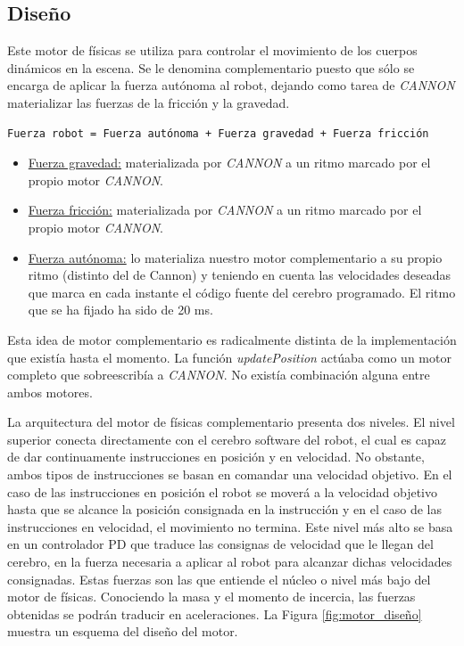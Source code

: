 \subsection{Diseño}
Este motor de físicas se utiliza para controlar el movimiento de los cuerpos dinámicos en la escena. Se le denomina complementario puesto que sólo se encarga de aplicar la fuerza autónoma al robot, dejando como tarea de \textit{CANNON} materializar las fuerzas de la fricción y la gravedad.

\begin{verbatim}
Fuerza robot = Fuerza autónoma + Fuerza gravedad + Fuerza fricción
\end{verbatim}

\begin{itemize}
    \item \underline{Fuerza gravedad:} materializada por \textit{CANNON} a un ritmo marcado por el propio motor \textit{CANNON}.
    \item \underline{Fuerza fricción:} materializada por \textit{CANNON} a un ritmo marcado por el propio motor \textit{CANNON}.
    \item \underline{Fuerza autónoma:} lo materializa nuestro motor complementario a su propio ritmo (distinto del de Cannon) y teniendo en cuenta las velocidades deseadas que marca en cada instante el código fuente del cerebro programado. El ritmo que se ha fijado ha sido de 20 ms.
\end{itemize}

Esta idea de motor complementario es radicalmente distinta de la implementación que existía hasta el momento. La función \textit{updatePosition} actúaba como un motor completo que sobreescribía a \textit{CANNON}. No existía combinación alguna entre ambos motores. \newline


La arquitectura del motor de físicas complementario presenta dos niveles. El nivel superior conecta directamente con el cerebro software del robot, el cual es capaz de dar continuamente instrucciones en posición y en velocidad. No obstante, ambos tipos de instrucciones se basan en comandar una velocidad objetivo. En el caso de las instrucciones en posición el robot se moverá a la velocidad objetivo hasta que se alcance la posición consignada en la instrucción y en el caso de las instrucciones en velocidad, el movimiento no termina. Este nivel más alto se basa en un controlador PD que traduce las consignas de velocidad que le llegan del cerebro, en la fuerza necesaria a aplicar al robot para alcanzar dichas velocidades consignadas. Estas fuerzas son las que entiende el núcleo o nivel más bajo del motor de físicas. Conociendo la masa y el momento de incercia, las fuerzas obtenidas se podrán traducir en aceleraciones. La Figura \ref{fig:motor_diseño} muestra un esquema del diseño del motor. \newline

